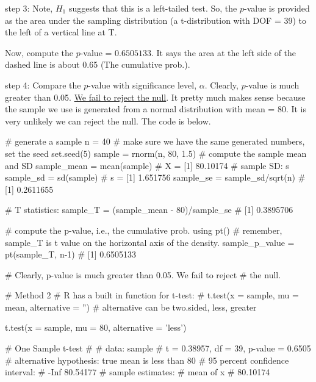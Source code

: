 \documentclass[12pt]{article}
\begin{document}
step 3: Note, $ H_1 $ suggests that this is a left-tailed test. So,
the $ p $-value is provided as the area under the sampling distribution
(a t-distribution with DOF = 39) to the left of a vertical line at T.

Now, compute the $ p $-value = $ 0.6505133 $. It says the area at the
left side of the dashed line is about 0.65 (The cumulative prob.).


step 4: Compare the $ p $-value with significance level, $ \alpha $.
Clearly, $ p $-value is much greater than 0.05. 
{\underline {We fail to reject the null}}. It pretty much makes sense
because the sample we use is generated from a normal distribution with
mean = 80. It is very unlikely we can reject the null. The code is 
below.

\begin{figure}[H]
\end{figure}









\begin{rc}
 
# generate a sample
n = 40
# make sure we have the same generated numbers, set the seed
set.seed(5)
sample = rnorm(n, 80, 1.5)
# compute the sample mean and SD
sample_mean = mean(sample)			# X = [1] 80.10174
# sample SD: s
sample_sd = sd(sample)				# s = [1] 1.651756
sample_se = sample_sd/sqrt(n)	# [1] 0.2611655

# T statistics:
sample_T = (sample_mean - 80)/sample_se		# [1] 0.3895706

# compute the p-value, i.e., the cumulative prob. using pt()
# remember, sample_T is t value on the horizontal axis of the density.
sample_p_value = pt(sample_T, n-1)		# [1] 0.6505133

# Clearly, p-value is much greater than 0.05. We fail to reject 
# the null.


# Method 2
# R has a built in function for t-test:
# t.test(x = sample, mu = mean, alternative = '')
# alternative can be two.sided, less, greater


t.test(x = sample, mu = 80, alternative = 'less')

#	        One Sample t-test
#	
#	data:  sample
#	t = 0.38957, df = 39, p-value = 0.6505
#	alternative hypothesis: true mean is less than 80
#	95 percent confidence interval:
#	     -Inf 80.54177
#	sample estimates:
#	mean of x
#	 80.10174

\end{rc}
\end{document}
